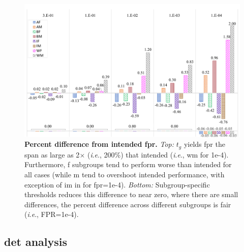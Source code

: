 \documentclass[10pt,twocolumn,letterpaper]{article}
\newcommand{\ie}{\textit{i}.\textit{e}., }
\begin{document}
\begin{figure}[t!]
 
    
       \centering
    \includegraphics[width=.95\linewidth]{figures/adaptive_fpr_percent_diff_complete.pdf}
    \caption{\small{\textbf{Percent difference from intended \gls{fpr}.} \emph{Top:} $t_g$ yields \gls{fpr} the span as large as 2$\times$ (\ie 200\%) that intended (\ie \gls{wm} for 1e-4). Furthermore, \gls{f} subgroups tend to perform worse than intended for all cases (while \gls{m} tend to overshoot intended performance, with exception of \gls{im} in for \gls{fpr}=1e-4). \emph{Bottom:} Subgroup-specific thresholds reduces this difference to near zero, where there are small differences, the percent difference across different subgroups is fair (\ie FPR=1e-4).}}\label{fig:percent:difference}
\end{figure}
\subsection{\gls{det} analysis}
\end{document}
